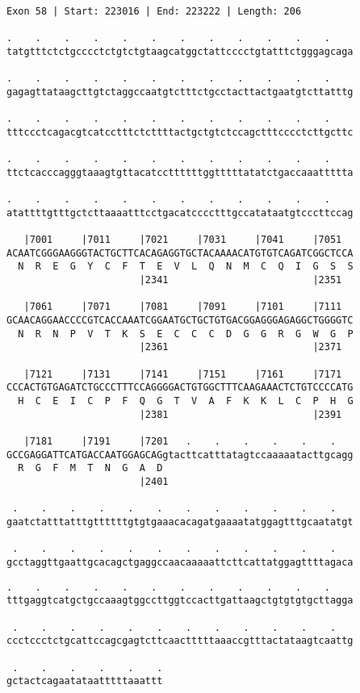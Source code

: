 \documentclass{article}
\begin{document}
\begin{Verbatim}[fontfamily=courier]
Exon 58 | Start: 223016 | End: 223222 | Length: 206

.    .    .    .    .    .    .    .    .    .    .    .    
tatgtttctctgcccctctgtctgtaagcatggctattcccctgtatttctgggagcaga

.    .    .    .    .    .    .    .    .    .    .    .    
gagagttataagcttgtctaggccaatgtctttctgcctacttactgaatgtcttatttg

.    .    .    .    .    .    .    .    .    .    .    .    
tttccctcagacgtcatcctttctcttttactgctgtctccagctttcccctcttgcttc

.    .    .    .    .    .    .    .    .    .    .    .    
ttctcacccagggtaaagtgttacatccttttttggtttttatatctgaccaaattttta

.    .    .    .    .    .    .    .    .    .    .    .    
atattttgtttgctcttaaaatttcctgacatcccctttgccatataatgtcccttccag

   |7001     |7011     |7021     |7031     |7041     |7051  
ACAATCGGGAAGGGTACTGCTTCACAGAGGTGCTACAAAACATGTGTCAGATCGGCTCCA
  N  R  E  G  Y  C  F  T  E  V  L  Q  N  M  C  Q  I  G  S  S
                       |2341                         |2351  

   |7061     |7071     |7081     |7091     |7101     |7111  
GCAACAGGAACCCCGTCACCAAATCGGAATGCTGCTGTGACGGAGGGAGAGGCTGGGGTC
  N  R  N  P  V  T  K  S  E  C  C  C  D  G  G  R  G  W  G  P
                       |2361                         |2371  

   |7121     |7131     |7141     |7151     |7161     |7171  
CCCACTGTGAGATCTGCCCTTTCCAGGGGACTGTGGCTTTCAAGAAACTCTGTCCCCATG
  H  C  E  I  C  P  F  Q  G  T  V  A  F  K  K  L  C  P  H  G
                       |2381                         |2391  

   |7181     |7191     |7201   .    .    .    .    .    .   
GCCGAGGATTCATGACCAATGGAGCAGgtacttcatttatagtccaaaaatacttgcagg
  R  G  F  M  T  N  G  A  D                                 
                       |2401                                

 .    .    .    .    .    .    .    .    .    .    .    .   
gaatctatttatttgttttttgtgtgaaacacagatgaaaatatggagtttgcaatatgt

 .    .    .    .    .    .    .    .    .    .    .    .   
gcctaggttgaattgcacagctgaggccaacaaaaattcttcattatggagttttagaca

\end{Verbatim}
\newpage
\begin{Verbatim}[fontfamily=courier]
 .    .    .    .    .    .    .    .    .    .    .    .   
tttgaggtcatgctgccaaagtggccttggtccacttgattaagctgtgtgtgcttagga

 .    .    .    .    .    .    .    .    .    .    .    .   
ccctccctctgcattccagcgagtcttcaactttttaaaccgtttactataagtcaattg

 .    .    .    .    .    .
gctactcagaatataatttttaaattt
\end{Verbatim}
\end{document}

